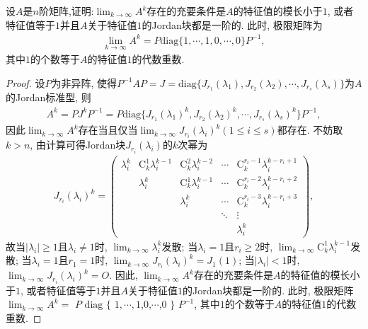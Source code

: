\documentclass[../../main.tex]{subfiles}%
\begin{document}
\begin{proposition}\label{proposition:矩阵方幂极限存在的充要条件及极限矩阵}
设$A$是$n$阶矩阵,证明:$\lim_{k \to \infty} A^k$存在的充要条件是$A$的特征值的模长小于$1$, 或者特征值等于$1$并且$A$关于特征值$1$的Jordan块都是一阶的. 此时, 极限矩阵为
\begin{align*}
\lim_{k \to \infty} A^k = P\mathrm{diag}\{1,\cdots,1,0,\cdots,0\}P^{-1},
\end{align*}
其中$1$的个数等于$A$的特征值$1$的代数重数.
\end{proposition}
\begin{proof}

设$P$为非异阵, 使得$P^{-1}AP = J=\mathrm{diag}\{J_{r_1}(\lambda_1),J_{r_2}(\lambda_2),\cdots,J_{r_s}(\lambda_s)\}$为$A$的Jordan标准型, 则
\begin{align*}
A^k = PJ^kP^{-1}=P\mathrm{diag}\{J_{r_1}(\lambda_1)^k,J_{r_2}(\lambda_2)^k,\cdots,J_{r_s}(\lambda_s)^k\}P^{-1},
\end{align*}
因此$\lim_{k \to \infty} A^k$存在当且仅当$\lim_{k \to \infty} J_{r_i}(\lambda_i)^k (1\leqslant i \leqslant s)$都存在. 不妨取$k > n$, 由计算可得Jordan块$J_{r_i}(\lambda_i)$的$k$次幂为
\begin{align*}
J_{r_i}(\lambda_i)^k = 
\begin{pmatrix}
\lambda_i^k & \mathrm{C}_{k}^{1}\lambda_i^{k - 1} & \mathrm{C}_{k}^{2}\lambda_i^{k - 2} & \cdots & \mathrm{C}_{k}^{r_i - 1}\lambda_i^{k - r_i + 1} \\
 & \lambda_i^k & \mathrm{C}_{k}^{1}\lambda_i^{k - 1} & \cdots & \mathrm{C}_{k}^{r_i - 2}\lambda_i^{k - r_i + 2} \\
 & & \lambda_i^k & \cdots & \mathrm{C}_{k}^{r_i - 3}\lambda_i^{k - r_i + 3} \\
 & & & \ddots & \vdots \\
 & & & & \lambda_i^k
\end{pmatrix},
\end{align*}
故当$|\lambda_i|\geqslant 1$且$\lambda_i\neq 1$时, $\lim_{k \to \infty} \lambda_i^k$发散; 当$\lambda_i = 1$且$r_i\geqslant 2$时, $\lim_{k \to \infty} \mathrm{C}_{k}^{1}\lambda_i^{k - 1}$发散; 当$\lambda_i = 1$且$r_1 = 1$时, $\lim_{k \to \infty} J_{r_i}(\lambda_i)^k = J_1(1)$; 当$|\lambda_i| < 1$时, $\lim_{k \to \infty} J_{r_i}(\lambda_i)^k = O$. 因此, $\lim_{k \to \infty} A^k$存在的充要条件是$A$的特征值的模长小于$1$, 或者特征值等于$1$并且$A$关于特征值$1$的Jordan块都是一阶的. 此时, 极限矩阵$\lim_{k \to \infty} A^k = $ $P$ $\mathrm{diag}$ $\{$ $1,\cdots,1$,$0$,$\cdots$,$0$ $\}$ $P^{-1}$, 其中$1$的个数等于$A$的特征值$1$的代数重数.

\end{proof}
\end{document}

